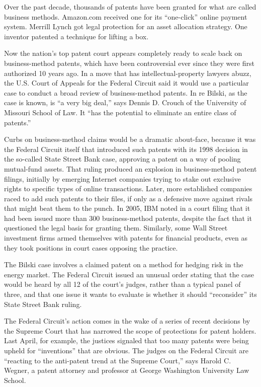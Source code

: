 Over the past decade, thousands of patents have been granted for what are called business methods. Amazon.com received one for its ``one-click'' online payment system. Merrill Lynch got legal protection for an asset allocation strategy. One inventor patented a technique for lifting a box.


Now the nation's top patent court appears completely ready to scale back on business-method patents, which have been controversial ever since they were first authorized 10 years ago. In a move that has intellectual-property lawyers abuzz, the U.S. Court of Appeals for the Federal Circuit said it would use a particular case to conduct a broad review of business-method patents. In re Bilski, as the case is known, is ``a very big deal,'' says Dennis D. Crouch of the University of Missouri School of Law. It ``has the potential to eliminate an entire class of patents.''


Curbs on business-method claims would be a dramatic about-face, because it was the Federal Circuit itself that introduced such patents with its 1998 decision in the so-called State Street Bank case, approving a patent on a way of pooling mutual-fund assets. That ruling produced an explosion in business-method patent filings, initially by emerging Internet companies trying to stake out exclusive rights to specific types of online transactions. Later, more established companies raced to add such patents to their files, if only as a defensive move against rivals that might beat them to the punch. In 2005, IBM noted in a court filing that it had been issued more than 300 business-method patents, despite the fact that it questioned the legal basis for granting them. Similarly, some Wall Street investment firms armed themselves with patents for financial products, even as they took positions in court cases opposing the practice.


The Bilski case involves a claimed patent on a method for hedging risk in the energy market. The Federal Circuit issued an unusual order stating that the case would be heard by all 12 of the court's judges, rather than a typical panel of three, and that one issue it wants to evaluate is whether it should ``reconsider'' its State Street Bank ruling.


The Federal Circuit's action comes in the wake of a series of recent decisions by the Supreme Court that has narrowed the scope of protections for patent holders. Last April, for example, the justices signaled that too many patents were being upheld for ``inventions'' that are obvious. The judges on the Federal Circuit are ``reacting to the anti-patent trend at the Supreme Court,'' says Harold C. Wegner, a patent attorney and professor at George Washington University Law School.